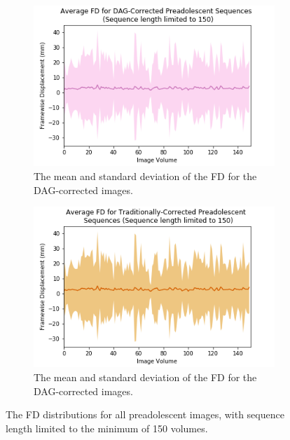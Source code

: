 \begin{figure}[ht]
	\begin{subfigure}{0.45\textwidth}
		\centering
		\includegraphics[width=1\textwidth]{6/figures/pread-dag-fd-150.png}
		\caption{The mean and standard deviation of the FD for the DAG-corrected images.}
	\end{subfigure}%
	\vspace{0.05\textwidth}
	\begin{subfigure}{0.45\textwidth}
		\centering
		\includegraphics[width=1\textwidth]{6/figures/pread-trad-fd-150.png}
		\caption{The mean and standard deviation of the FD for the DAG-corrected images.}
	\end{subfigure}
\caption{The FD distributions for all preadolescent images, with sequence length limited to the minimum of 150 volumes.}
\label{fig:pread-fd-150}
\end{figure}

